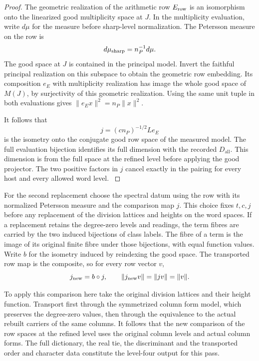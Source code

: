 \begin{proof}
The geometric realization of the arithmetic row
\(E_{\rm row}\) is an isomorphism onto the linearized
good multiplicity space at \(J\). In the multiplicity evaluation, write \(d\mu\) for the measure before sharp-level normalization. The Petersson measure on the row is
\[
 d\mu_{\rm sharp}=n_P^{-1}d\mu .
\]
The good space at \(J\) is contained in the principal
model. Invert the faithful principal realization on
this subspace to obtain the geometric row embedding.
Its composition \(e_E\) with multiplicity realization
has image the whole good space of \(M(J)\), by surjectivity
of this geometric realization. Using the same unit tuple
in both evaluations gives \(\|e_E x\|^2=n_P\|x\|^2\).

It follows that
\[
             j=(c n_P)^{-1/2}L e_E
\]
is the isometry onto the conjugate good row space of the
measured model. The full evaluation bijection identifies
its full dimension with the recorded \(D_{\mathrm{all}}\).
This dimension is from the full space at the refined level before applying
the good projector. The two positive factors in \(j\) cancel
exactly in the pairing for every host and every allowed
word level.
\label{cor:real-row-realization-6}
\end{proof}

For the second replacement choose the spectral datum
using the row with its normalized Petersson measure and the comparison map \(j\). This choice fixes
\(t,c,j\) before any replacement of the division lattices
and heights on the word spaces. If a replacement retains
the degree-zero levels and readings, the term fibres are
carried by the two induced bijections of class labels.
The fibre of a term is the image of its original finite
fibre under those bijections, with equal function values.
Write \(b\) for the isometry induced by reindexing the good space. The transported row map is the composite, so for every row vector \(v\),
\[
 j_{\rm new}=b\circ j,\qquad\|j_{\rm new}v\|=\|jv\|=\|v\|.
\]

To apply
this comparison here take the original division lattices
and their height function. Transport first through the
symmetrized column form model, which preserves the
degree-zero values, then through the equivalence to the
actual rebuilt carriers of the same columns. It follows
that the new comparison of the row spaces at the refined level uses the original
column levels and actual column forms. The full
dictionary, the real tie, the discriminant and the
transported order and character data constitute the
level-four output for this pass.
\label{cor:real-row-realization-7}

